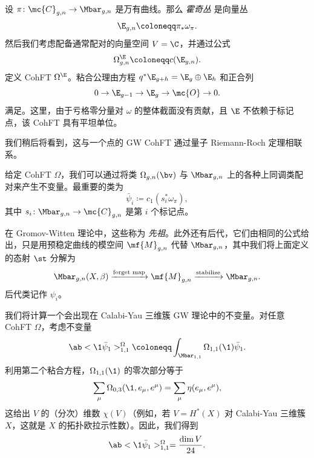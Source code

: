 \begin{exm}
    设 $\pi \colon \mc{C}_{g,n} \to \Mbar_{g,n}$ 是万有曲线。那么 \textit{霍奇丛} 是向量丛
    \[ \E_{g,n} \coloneqq \pi_* \omega_{\pi}. \]
    然后我们考虑配备通常配对的向量空间 $V = \C$，并通过公式
    \[ \Omega^{\E}_{g,n} \coloneqq c(\E_{g,n}). \]
    定义 CohFT $\Omega^{\E}$。粘合公理由方程 $q^* \E_{g+h} = \E_g \oplus \E_h$ 和正合列
    \[ 0 \to \E_{g-1} \to \E_g \to \mc{O} \to 0. \]
    满足。这里，由于亏格零分量对 $\omega$ 的整体截面没有贡献，且 $\E$ 不依赖于标记点，该 CohFT 具有平坦单位。
\end{exm}

\begin{rmk}
    我们稍后将看到，这与一个点的 GW CohFT 通过量子 Riemann-Roch 定理相联系。
\end{rmk}

给定 CohFT $\Omega$，我们可以通过将类 $\Omega_{g,n}(\bv)$ 与 $\Mbar_{g,n}$ 上的各种上同调类配对来产生不变量。最重要的类为
\[ \bar{\psi}_i \coloneqq c_1( s_i^* \omega_{\pi} ), \]
其中 $s_i \colon \Mbar_{g,n} \to \mc{C}_{g,n}$ 是第 $i$ 个标记点。

\begin{rmk}
    在 Gromov-Witten 理论中，这些称为 \textit{先祖}。此外还有后代，它们由相同的公式给出，只是用预稳定曲线的模空间 $\mf{M}_{g,n}$ 代替 $\Mbar_{g,n}$，其中我们将上面定义的态射 $\st$ 分解为
    \[ \Mbar_{g,n}(X,\beta) \xrightarrow{\text{forget map}} \mf{M}_{g,n} \xrightarrow{\text{stabilize}} \Mbar_{g,n}. \]
    后代类记作 $\psi_i$。
\end{rmk}

\begin{exm}
    我们将计算一个会出现在 Calabi-Yau 三维簇 GW 理论中的不变量。对任意 CohFT $\Omega$，考虑不变量
    \[ \ab<\1\bar{\psi}_1>_{1,1}^{\Omega}\coloneqq \int_{\Mbar_{1,1}} \Omega_{1,1}(\1)\bar{\psi}_1. \]
    利用第二个粘合方程，$\Omega_{1,1}(\1)$ 的零次部分等于
    \[ \sum_{\mu} \Omega_{0,3}(\1, e_{\mu}, e^{\mu}) = \sum_{\mu} \eta(e_{\mu}, e^{\mu}), \]
    这给出 $V$ 的（分次）维数 $\chi(V)$（例如，若 \(V = H^*(X)\) 对 Calabi-Yau 三维簇 \(X\)，这就是 \(X\) 的拓扑欧拉示性数）。因此，我们得到
    \[ \ab<\1\bar{\psi}_1>_{1,1}^{\Omega} = \frac{\dim V}{24}. \]
\end{exm}

